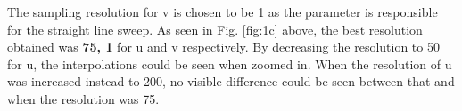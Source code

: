 \documentclass[acmlarge,nonacm=true]{acmart}
\begin{document}
The sampling resolution for v is chosen to be 1 as the parameter is responsible for the straight line sweep.
 As seen in Fig. \ref{fig:1c} above, the best resolution obtained was \textbf{75, 1} for u and v respectively.
By decreasing the resolution to 50 for u, the interpolations could be seen when zoomed in. When the resolution of u was 
increased instead to 200, no visible difference could be seen between that and when the resolution was 75.


\newpage
\end{document}
